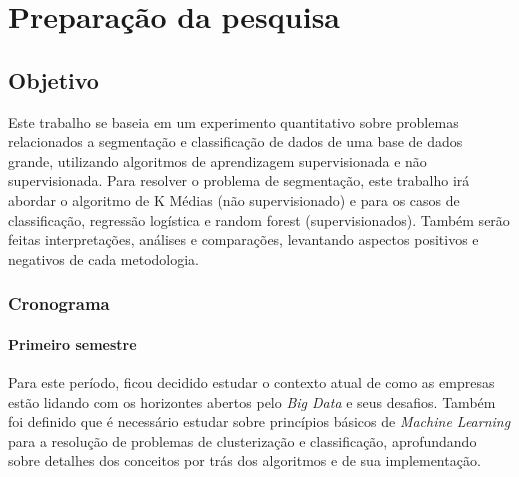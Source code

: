 
\part{Preparação da pesquisa}

\chapter{Objetivo}

Este trabalho se baseia em um experimento quantitativo sobre problemas relacionados a segmentação e classificação de dados de uma base de dados grande, utilizando algoritmos de aprendizagem supervisionada e não supervisionada. Para resolver o problema de segmentação, este trabalho irá abordar o algoritmo de K Médias (não supervisionado) e para os casos de classificação, regressão logística e random forest (supervisionados). Também serão feitas interpretações, análises e comparações, levantando aspectos positivos e negativos de cada metodologia.

\section{Cronograma}

\subsection{Primeiro semestre}

Para este período, ficou decidido estudar o contexto atual de como as empresas estão lidando com os horizontes abertos pelo \emph{Big Data} e seus desafios. Também foi definido que é necessário estudar sobre princípios básicos de \emph{Machine Learning} para a resolução de problemas de clusterização e classificação, aprofundando sobre detalhes dos conceitos por trás dos algoritmos e de sua implementação.

